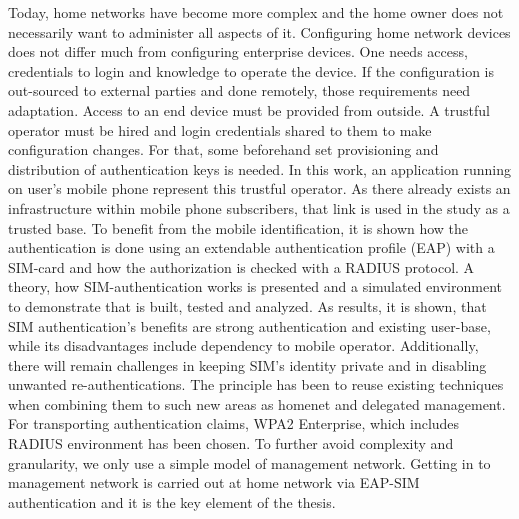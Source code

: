 \documentclass[12pt,a4paper,english]{tutthesis}
\begin{document}
Today, home networks have become more complex and the home owner 
does not necessarily want to administer all aspects of it.
Configuring home network devices does not differ much from configuring enterprise devices. One needs access, credentials to login and knowledge to operate the device. If the configuration is out-sourced to external parties and 
done remotely, those requirements need adaptation.
Access to an end device must be provided from outside. 
A trustful operator must be hired and login credentials shared to them to make configuration changes.
For that,  some beforehand set provisioning and distribution of authentication keys is needed.
In this work, an application running on user's mobile phone represent this trustful operator. 
As there already exists an infrastructure within mobile phone subscribers, that link is used in the study as a trusted base.
To benefit from the mobile identification, it is shown how
the authentication is done using an extendable authentication profile (EAP) with a SIM-card
and how the authorization is checked with a RADIUS protocol.
A theory, how SIM-authentication works is presented and a simulated environment
to demonstrate that is built, tested and analyzed.
As results, it is shown, that SIM authentication's benefits are strong
authentication and existing user-base, while its disadvantages include
dependency to mobile operator. Additionally, there will remain challenges in keeping SIM's identity private and in disabling unwanted re-authentications. %
The principle has been to reuse existing techniques when combining them to such new areas as homenet and delegated management.
 For transporting authentication claims, WPA2 Enterprise, which includes RADIUS environment has been chosen.
To further avoid complexity and granularity, we
only use a simple model of management network. Getting in to management network is carried out at home network via EAP-SIM authentication and it is the key element of the thesis.



\end{document}
